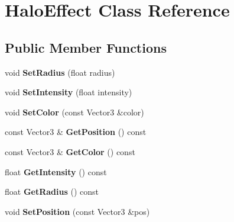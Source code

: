 \hypertarget{classHaloEffect}{}\section{Halo\+Effect Class Reference}
\label{classHaloEffect}
\subsection*{Public Member Functions}
\begin{DoxyCompactItemize}
\item 
\mbox{\label{classHaloEffect_abee34a573ebce91df24cb8780730d5bf}} 
void {\bfseries Set\+Radius} (float radius)
\item 
\mbox{\label{classHaloEffect_a7d8f0434fb0277d93f64b1e9eecacf76}} 
void {\bfseries Set\+Intensity} (float intensity)
\item 
\mbox{\label{classHaloEffect_a71a0daca89eeaca58de0ac973b568fa7}} 
void {\bfseries Set\+Color} (const Vector3 \&color)
\item 
\mbox{\label{classHaloEffect_a775ccc873130c615bd4c1fbd0abf7e11}} 
const Vector3 \& {\bfseries Get\+Position} () const
\item 
\mbox{\label{classHaloEffect_a103a5a12331c33b197a410292cddd341}} 
const Vector3 \& {\bfseries Get\+Color} () const
\item 
\mbox{\label{classHaloEffect_a84a3c6b6053f6f4e5215db8113e752c5}} 
float {\bfseries Get\+Intensity} () const
\item 
\mbox{\label{classHaloEffect_a408bdc91b45f3162f05901f46db1bf86}} 
float {\bfseries Get\+Radius} () const
\item 
\mbox{\label{classHaloEffect_ac18176eaf288934834aa0af6c80b0b53}} 
void {\bfseries Set\+Position} (const Vector3 \&pos)
\end{DoxyCompactItemize}

